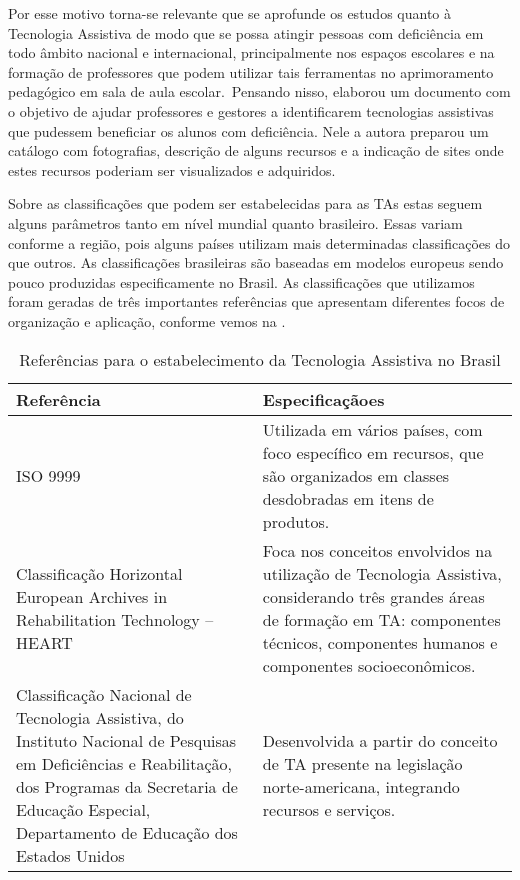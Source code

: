 \documentclass[portuguese]{textolivre}
\begin{document}
Por esse motivo torna-se relevante que
se aprofunde os estudos quanto à Tecnologia Assistiva de modo que se
possa atingir pessoas com deficiência em todo âmbito nacional e
internacional, principalmente nos espaços escolares e na formação de
professores que podem utilizar tais ferramentas no aprimoramento
pedagógico em sala de aula escolar.~Pensando nisso, \textcite{bersch2013}
elaborou um documento com o objetivo de ajudar professores e gestores a
identificarem tecnologias assistivas que pudessem beneficiar os alunos
com deficiência. Nele a autora preparou um catálogo com fotografias,
descrição de alguns recursos e a indicação de sites onde estes recursos
poderiam ser visualizados e adquiridos.

Sobre as classificações que podem ser
estabelecidas para as TAs estas seguem alguns parâmetros tanto em nível
mundial quanto brasileiro. Essas variam conforme a região, pois alguns
países utilizam mais determinadas classificações do que outros. As
classificações brasileiras são baseadas em modelos europeus sendo pouco
produzidas especificamente no Brasil. As classificações que utilizamos
foram geradas de três importantes referências que apresentam diferentes
focos de organização e aplicação, conforme vemos na .

\begin{table}[h]
\centering
\begin{threeparttable}
\caption{Referências para o estabelecimento da Tecnologia Assistiva no Brasil}\label{tbl01}
\begin{tabular}{
>{\raggedright\arraybackslash}p{}
>{\raggedright\arraybackslash}p{}} 
\toprule
Referência & Especificaçãoes \\
\midrule
ISO 9999 & Utilizada em vários países, com foco específico em recursos, que são organizados em classes desdobradas em itens de produtos. \\
Classificação Horizontal European Archives in Rehabilitation Technology – HEART & Foca nos conceitos envolvidos na utilização de Tecnologia Assistiva, considerando três grandes áreas de formação em TA: componentes técnicos, componentes humanos e componentes socioeconômicos. \\
Classificação Nacional de Tecnologia Assistiva, do Instituto Nacional de Pesquisas em Deficiências e Reabilitação, dos Programas da Secretaria de Educação Especial, Departamento de Educação dos Estados Unidos & Desenvolvida a partir do conceito de TA presente na legislação norte-americana, integrando recursos e serviços. \\
\bottomrule
\end{tabular}
\end{threeparttable}
\end{table}
\end{document}
